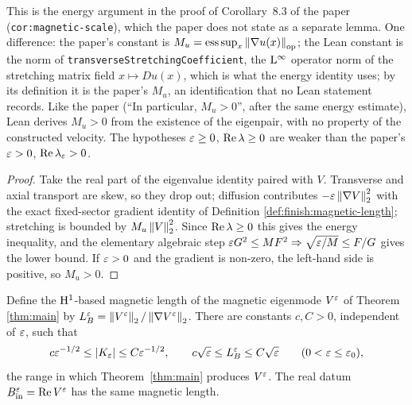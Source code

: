 This is the energy argument in the proof of Corollary~8.3 of the paper
(\texttt{cor:magnetic-scale}), which the paper does not state as a separate lemma.  One
difference: the paper's constant is
$M_u=\mathrm{ess\,sup}_x\left\|\nabla u(x)\right\|_{\mathrm{op}}$; the Lean constant is the norm of
\texttt{transverseStretchingCoefficient}, the $\mathrm{L}^\infty$ operator norm of the stretching matrix
field $x\mapsto Du(x)$, which is what the energy identity uses; by its definition it is the
paper's $M_u$, an identification that no Lean statement records.
Like the paper (``In particular, $M_u>0$'', after the same energy estimate), Lean derives
$M_u>0$ from the existence of the eigenpair, with no property of the constructed velocity.  The hypotheses
$\varepsilon\geq0$, $\operatorname{Re}\lambda\geq0$ are weaker than the paper's $\varepsilon>0$, $\operatorname{Re}\lambda_\varepsilon>0$.

\begin{proof}
  \leanok
  Take the real part of the eigenvalue identity paired with $V$.  Transverse and axial transport
  are skew, so they drop out; diffusion contributes $-\varepsilon\left\|\nabla V\right\|_2^2$ with the exact
  fixed-sector gradient identity of Definition \ref{def:finish:magnetic-length}; stretching is
  bounded by $M_u\left\|V\right\|_2^2$.  Since $\operatorname{Re}\lambda\geq0$ this gives the energy inequality, and the
  elementary algebraic step $\varepsilon G^2\leq MF^2\Rightarrow\sqrt{\varepsilon/M}\leq F/G$ gives the lower
  bound.  If $\varepsilon>0$ and the gradient is non-zero, the left-hand side is positive, so $M_u>0$.
\end{proof}

\begin{corollary}
  \label{cor:magnetic-scale}
  \leanok
  Define the $\mathrm{H}^1$-based magnetic length of the magnetic eigenmode $V^\varepsilon$ of Theorem
  \ref{thm:main} by $L_B^\varepsilon=\left\|V^\varepsilon\right\|_2/\left\|\nabla V^\varepsilon\right\|_2$.  There are constants
  $c,C>0$, independent of $\varepsilon$, such that
  \[
    c\varepsilon^{-1/2}\leq\left\lvert K_\varepsilon\right\rvert\leq C\varepsilon^{-1/2},
    \qquad
    c\sqrt{\varepsilon}\leq L_B^\varepsilon\leq C\sqrt{\varepsilon}
    \qquad(0<\varepsilon\leq\varepsilon_0),
  \]
  the range in which Theorem~\ref{thm:main} produces $V^\varepsilon$.  The real datum
  $B_{\rm in}^\varepsilon=\operatorname{Re} V^\varepsilon$ has the same magnetic length.
\end{corollary}

